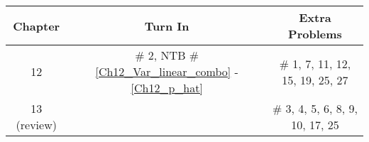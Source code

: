 \documentclass[12pt]{article}
\begin{document}
\begin{center}
\begin{tabular}{|c|c||c|}
\hline
Chapter & Turn In & Extra Problems\\
\hline



%




12 & \# 2, NTB  \#\ref{Ch12_Var_linear_combo} - \ref{Ch12_p_hat} & \# 1, 7, 11, 12, 15, 19, 25, 27\\
\hline	
13 (review) &   & \# 3, 4, 5, 6, 8, 9, 10, 17, 25 \\


\end{tabular}
\end{center}
\end{document}
